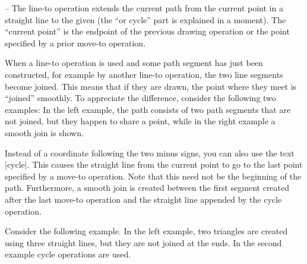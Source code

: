 \begin{pathoperation}{--}{}
    The line-to operation extends the current path from the current point in a
    straight line to the given  (the ``or cycle'' part is
    explained in a moment). The ``current point'' is the endpoint of the
    previous drawing operation or the point specified by a prior move-to
    operation.

    When a line-to operation is used and some path segment has just been
    constructed, for example by another line-to operation, the two line
    segments become joined. This means that if they are drawn, the point where
    they meet is ``joined'' smoothly. To appreciate the difference, consider
    the following two examples: In the left example, the path consists of two
    path segments that are not joined, but they happen to share a point, while
    in the right example a smooth join is shown.
\begin{codeexample}[]
\end{codeexample}

    Instead of a coordinate following the two minus signs, you can also use the
    text |cycle|. This causes the straight line from the current point to go to
    the last point specified by a move-to operation. Note that this need not be
    the beginning of the path. Furthermore, a smooth join is created between
    the first segment created after the last move-to operation and the straight
    line appended by the cycle operation.

    Consider the following example. In the left example, two triangles are
    created using three straight lines, but they are not joined at the ends. In
    the second example cycle operations are used.
\begin{codeexample}[]
\end{codeexample}
\end{pathoperation}


